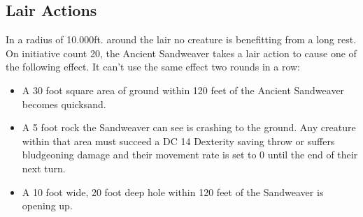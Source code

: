 \subsection*{Lair Actions}
In a radius of 10.000ft. around the lair no creature is benefitting from a long rest.\\
On initiative count 20, the Ancient Sandweaver takes a lair action to cause one of the following effect. It can't use the same effect two rounds in a row:
\begin{itemize}
	\item A 30 foot square area of ground within 120 feet of the Ancient Sandweaver becomes quicksand.
	\item A 5 foot rock the Sandweaver can see is crashing to the ground. Any creature within that area must succeed a DC 14 Dexterity saving throw or suffers  bludgeoning damage and their movement rate is set to 0 until the end of their next turn.
	\item A 10 foot wide, 20 foot deep hole within 120 feet of the Sandweaver is opening up.
\end{itemize}